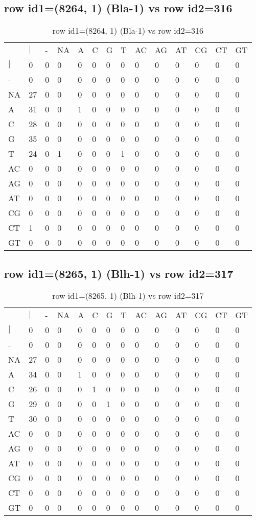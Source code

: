 \subsection{row id1=(8264, 1) (Bla-1) vs row id2=316}
\begin{center}
\begin{longtable}{|l|l|l|l|l|l|l|l|l|l|l|l|l|l|}
\caption{row id1=(8264, 1) (Bla-1) vs row id2=316} \label{table_dm414}\\
\hline
\\
\hline
&$|$&-&NA&A&C&G&T&AC&AG&AT&CG&CT&GT\\
$|$&0&0&0&0&0&0&0&0&0&0&0&0&0\\
-&0&0&0&0&0&0&0&0&0&0&0&0&0\\
NA&27&0&0&0&0&0&0&0&0&0&0&0&0\\
A&31&0&0&1&0&0&0&0&0&0&0&0&0\\
C&28&0&0&0&0&0&0&0&0&0&0&0&0\\
G&35&0&0&0&0&0&0&0&0&0&0&0&0\\
T&24&0&1&0&0&0&1&0&0&0&0&0&0\\
AC&0&0&0&0&0&0&0&0&0&0&0&0&0\\
AG&0&0&0&0&0&0&0&0&0&0&0&0&0\\
AT&0&0&0&0&0&0&0&0&0&0&0&0&0\\
CG&0&0&0&0&0&0&0&0&0&0&0&0&0\\
CT&1&0&0&0&0&0&0&0&0&0&0&0&0\\
GT&0&0&0&0&0&0&0&0&0&0&0&0&0\\
\hline
\end{longtable}
\end{center}

\subsection{row id1=(8265, 1) (Blh-1) vs row id2=317}
\begin{center}
\begin{longtable}{|l|l|l|l|l|l|l|l|l|l|l|l|l|l|}
\caption{row id1=(8265, 1) (Blh-1) vs row id2=317} \label{table_dm416}\\
\hline
\\
\hline
&$|$&-&NA&A&C&G&T&AC&AG&AT&CG&CT&GT\\
$|$&0&0&0&0&0&0&0&0&0&0&0&0&0\\
-&0&0&0&0&0&0&0&0&0&0&0&0&0\\
NA&27&0&0&0&0&0&0&0&0&0&0&0&0\\
A&34&0&0&1&0&0&0&0&0&0&0&0&0\\
C&26&0&0&0&1&0&0&0&0&0&0&0&0\\
G&29&0&0&0&0&1&0&0&0&0&0&0&0\\
T&30&0&0&0&0&0&0&0&0&0&0&0&0\\
AC&0&0&0&0&0&0&0&0&0&0&0&0&0\\
AG&0&0&0&0&0&0&0&0&0&0&0&0&0\\
AT&0&0&0&0&0&0&0&0&0&0&0&0&0\\
CG&0&0&0&0&0&0&0&0&0&0&0&0&0\\
CT&0&0&0&0&0&0&0&0&0&0&0&0&0\\
GT&0&0&0&0&0&0&0&0&0&0&0&0&0\\
\hline
\end{longtable}
\end{center}


